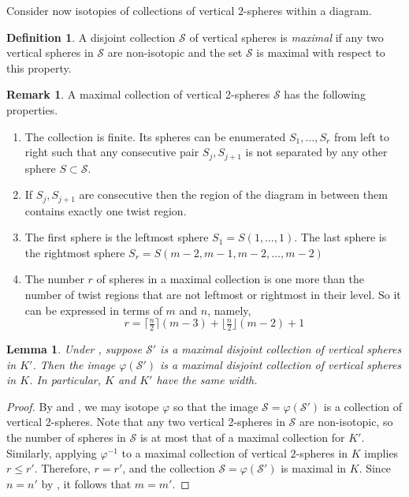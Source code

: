 \documentclass[12pt,reqno]{amsart}
\theoremstyle{plain}
\newtheorem{lemma}[theorem]{Lemma}
\theoremstyle{definition}
\newtheorem{definition}[theorem]{Definition}
\newtheorem{remark}[theorem]{Remark}
\newcommand{\calS}{\mathcal{S}}
\begin{document}
Consider now isotopies of collections of vertical $2$-spheres 
within a diagram. 

\begin{definition}\label{def:maximal}
A disjoint collection $\calS$ of vertical spheres is \emph{maximal} if any 
two vertical spheres in $\calS$ are non-isotopic and the set $\calS$ is maximal
with respect to this property. 
\end{definition}

\begin{remark}
A maximal collection of vertical 2-spheres $\calS$ has the following properties. 
\begin{enumerate}
\item The collection is finite. Its spheres can be enumerated $S_1,\dots,S_r$ 
from left to right such that any consecutive pair $S_j,S_{j+1}$ is not separated 
by any other sphere $S\subset\calS$.
\item If $S_j,S_{j+1}$ are consecutive then the region of the diagram in 
between them contains exactly one twist region.
\item The first sphere is the leftmost sphere $S_1 = S(1,\dots,1)$.
The last sphere is the rightmost sphere $S_r=S(m-2,m-1,m-2,\dots,m-2)$ 

\item The number $r$ of spheres in a maximal collection is one more 
than the number of twist regions that are not leftmost or rightmost 
in their level. So it can be expressed in terms of $m$ and $n$, namely, 
\begin{equation}
\label{size of maximal collection}
r = \lceil\tfrac{n}{2}\rceil(m-3) + \lfloor\tfrac{n}{2}\rfloor(m-2) + 1
\end{equation} 
\end{enumerate}
\end{remark}

\begin{lemma}\label{lem: maximal goes to maximal}
Under , 
suppose $\calS'$ is a maximal disjoint collection of vertical spheres 
in $K'$. Then the image $\varphi(\calS')$ is a maximal disjoint collection 
of vertical spheres in $K$. In particular, $K$ and $K'$ have the same width.
\end{lemma}

\begin{proof}
By  and ,
we may isotope $\varphi$ so that the image $\calS = \varphi(\calS')$ is a
collection of vertical 2-spheres. Note that any two vertical 2-spheres in 
$\calS$ are non-isotopic, so the number of spheres in $\calS$ 
is at most that of a maximal collection for $K'$. Similarly, applying 
$\varphi^{-1}$ to a maximal collection of vertical $2$-spheres in $K$ 
implies $r\leq r'$. Therefore, $r=r'$, and the collection
$\calS=\varphi(\calS')$ is maximal in $K$. Since $n=n'$ by 
, it follows that $m=m'$. 
\end{proof}
\end{document}

